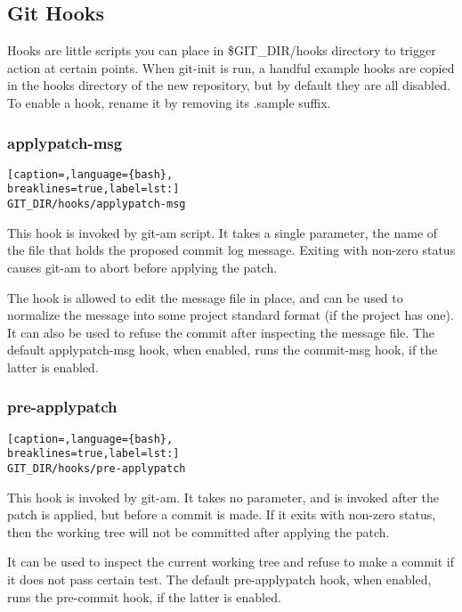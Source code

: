 \subsection{Git Hooks}
Hooks are little scripts you can place in \$GIT\_DIR/hooks directory to trigger
action at certain points. When git-init is run, a handful example hooks are
copied in the hooks directory of the new repository, but by default they are
all disabled. To enable a hook, rename it by removing its .sample suffix.

\subsubsection{applypatch-msg}
\lstset{basicstyle=\scriptsize, numbers=none, captionpos=b, tabsize=4}
\begin{lstlisting}[caption=,language={bash},
breaklines=true,label=lst:]
GIT_DIR/hooks/applypatch-msg
\end{lstlisting}

This hook is invoked by git-am script. It takes a single parameter, the name of
the file that holds the proposed commit log message. Exiting with non-zero
status causes git-am to abort before applying the patch.

The hook is allowed to edit the message file in place, and can be used to
normalize the message into some project standard format (if the project has
one). It can also be used to refuse the commit after inspecting the message
file. The default applypatch-msg hook, when enabled, runs the commit-msg hook,
if the latter is enabled.

\subsubsection{pre-applypatch}
\lstset{basicstyle=\scriptsize, numbers=none, captionpos=b, tabsize=4}
\begin{lstlisting}[caption=,language={bash},
breaklines=true,label=lst:]
GIT_DIR/hooks/pre-applypatch
\end{lstlisting}

This hook is invoked by git-am. It takes no parameter, and is invoked after the
patch is applied, but before a commit is made. If it exits with non-zero
status, then the working tree will not be committed after applying the patch.

It can be used to inspect the current working tree and refuse to make a commit
if it does not pass certain test. The default pre-applypatch hook, when
enabled, runs the pre-commit hook, if the latter is enabled.

